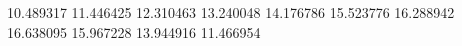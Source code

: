 10.489317
11.446425
12.310463
13.240048
14.176786
15.523776
16.288942
16.638095
15.967228
13.944916
11.466954
